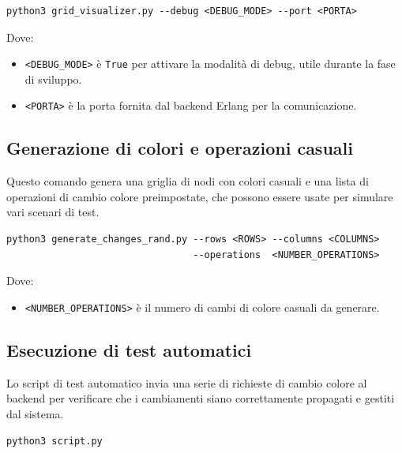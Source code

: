 \documentclass[12pt, a4paper]{report}
\begin{document}
\begin{tcolorbox}[title=Comandi di avvio del server Flask]
\begin{verbatim}
python3 grid_visualizer.py --debug <DEBUG_MODE> --port <PORTA>
\end{verbatim}
\end{tcolorbox}

\noindent Dove:
\begin{itemize}
    \item \texttt{<DEBUG\_MODE>} è \texttt{True} per attivare la modalità di debug, utile durante la fase di sviluppo.
    \item \texttt{<PORTA>} è la porta fornita dal backend Erlang per la comunicazione.
\end{itemize}

\subsection{Generazione di colori e operazioni casuali}
Questo comando genera una griglia di nodi con colori casuali e una lista di operazioni di cambio colore preimpostate, che possono essere usate per simulare vari scenari di test.

\begin{tcolorbox}[title=Generazione di colori e operazioni casuali]
\begin{verbatim}
python3 generate_changes_rand.py --rows <ROWS> --columns <COLUMNS> 
                                 --operations  <NUMBER_OPERATIONS>
\end{verbatim}
\end{tcolorbox}

\noindent Dove:
\begin{itemize}
    \item \texttt{<NUMBER\_OPERATIONS>} è il numero di cambi di colore casuali da generare.
\end{itemize}

\subsection{Esecuzione di test automatici}
Lo script di test automatico invia una serie di richieste di cambio colore al backend per verificare che i cambiamenti siano correttamente propagati e gestiti dal sistema.

\begin{tcolorbox}[title=Esecuzione di test automatici]
\begin{verbatim}
python3 script.py
\end{verbatim}
\end{tcolorbox}
\end{document}

